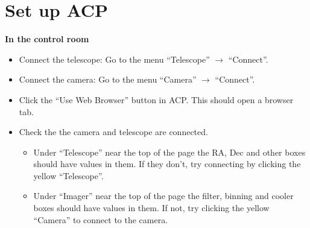 \documentclass[letterpaper, 12pt]{report}
\newcommand{\location}[1]{\noindent\large{\textbf{#1}}}
\newcommand{\incontrol}{\location{In the control room}}
\begin{document}
\begin{itemize}
%
\end{itemize}

\section{Set up ACP}
\incontrol

\begin{itemize}
	\item Connect the telescope: Go to the menu ``Telescope'' $\to$ ``Connect''.
	\item Connect the camera: Go to the menu ``Camera'' $\to$ ``Connect''.
	\item Click the ``Use Web Browser'' button in ACP. This should open a browser tab.
	\item Check the the camera and telescope are connected.
	\begin{itemize}
		\item Under ``Telescope'' near the top of the page the RA, Dec and other boxes should have values in them. If they don't, try connecting by clicking the yellow ``Telescope''.
		\item Under ``Imager'' near the top of the page the filter, binning and cooler boxes should have values in them. If not, try clicking the yellow ``Camera'' to connect to the camera.
	\end{itemize}
\end{itemize}
\end{document}
